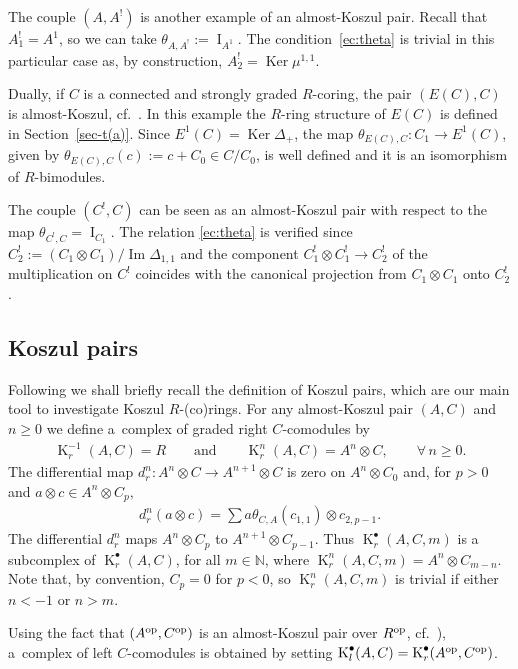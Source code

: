 \documentclass[pdftex]{sigma}
\def\Id{\operatorname{I}}
\DeclareMathOperator{\Ker}{Ker}
\DeclareMathOperator{\im}{Im}
\DeclareMathOperator{\K}{K}
\newcommand\ot{\otimes}
\renewcommand{\^}[1]{\mbox{$^{\left( #1 \right)}$}}
\renewcommand{\_}[1]{\mbox{$_{\left( #1 \right)}$}}
\newcommand{\N}{{\mathbb N}}
\numberwithin{equation}{section}
\begin{document}
The couple $(A,A^!)$ is another example of an almost-Koszul pair. Recall that $A^!_1=A^1$, so we can take $\theta_{A,A^!}:=\Id_{A^1}$. The condition~\eqref{ec:theta} is trivial in this particular case as, by construction, $A^!_2=\Ker\mu^{1,1}$.

Dually, if $C$ is a connected and strongly graded $R$-coring, the pair $(E(C),C)$ is almost-Koszul, cf.~\cite[Proposition~1.18]{jps}. In this example the $R$-ring structure of $E(C)$ is def\/ined in Section~\ref{sec-t(a)}. Since $E^1(C)=\Ker\Delta_+$, the map $\theta_{E(C),C}\colon C_1\to E^1(C)$, given by $\theta_{E(C),C}(c):=c+C_0\in C/C_0$, is well def\/ined and it is an isomorphism of $R$-bimodules.

The couple $(C^!,C)$ can be seen as an almost-Koszul pair with respect to the map $\theta_{C^!,C}=\Id_{ C_1}$. The relation \eqref{ec:theta} is verif\/ied since $C^!_2:=(C_1\ot C_1)/\im\Delta_{1,1}$ and the component $C_1^!\ot C_1^!\to C^!_2$ of the multiplication on $C^!$ coincides with the canonical projection from $C_1\ot C_1$ onto $C^!_2$.

\subsection{Koszul pairs} \label{fa:Koszul pairs}
Following \cite{jps} we shall brief\/ly recall the def\/inition of Koszul pairs, which are our main tool to investigate Koszul $R$-(co)rings. For any almost-Koszul pair $(A,C)$ and $n\geq 0$ we def\/ine a~complex of graded right $C$-comodules by
\begin{gather*} \operatorname{K}_r^{-1}(A,C)=R \qquad \text{and} \qquad \operatorname{K}^n_r(A,C)=A^n \otimes C, \qquad \forall\, n \geq 0.\end{gather*}
The dif\/ferential map $d_{r}^{n}\colon A^{n}\otimes C\rightarrow A^{n+1}\otimes C$ is zero on $A^{n}\otimes C_{0}$ and, for $p>0$ and $a\otimes c\in A^{n}\otimes C_{p},$
\begin{gather*}
 d_{r}^{n}(a\otimes c)=\sum\limits a\theta _{C,A}(c_{1,{1}})\otimes c_{2,{p-1}}.
\end{gather*}
The dif\/ferential $d^n_r$ maps $A^{n}\ot C_{p}$ to $A^{n+1}\ot C_{p-1}$. Thus $\K^\bullet_r(A,C,m)$ is a subcomplex of $\K^\bullet_r(A,C)$, for all $m\in\N$, where $\K^n_r(A,C,m)= A^{n}\ot C_{m-n}$. Note that, by convention, $C_p=0$ for $p<0$, so $\K^n_r(A,C,m)$ is trivial if either $n<-1$ or $n>m$.

Using the fact that $(A^{\rm op},C^{\rm op})$ is an almost-Koszul pair over $R^{\rm op}$, cf.\ \cite[Remark~1.4]{jps}), a~complex of left $C$-comodules is obtained by setting $\operatorname{K}_l^\bullet(A,C)=\operatorname{K}_r^\bullet(A^{\rm op},C^{\rm op})$.
\end{document}
